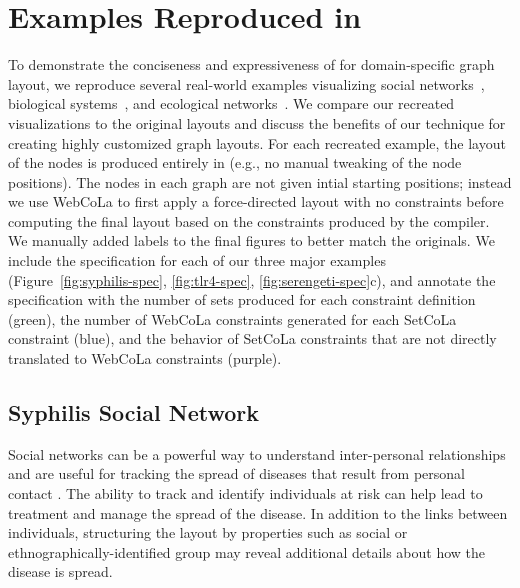 \section{Examples Reproduced in \projectname}

To demonstrate the conciseness and expressiveness of \projectname for domain-specific
graph layout, we reproduce several real-world examples visualizing social 
networks~\cite{rothenberg1998using}, biological systems~\cite{barsky2008cerebral}, 
and ecological networks~\cite{kruger2017,baskerville2011spatial}. 
We compare our recreated visualizations to the original layouts and 
discuss the benefits of our technique for creating highly customized graph layouts.
For each recreated example, the layout of the nodes is produced
entirely in \projectname (e.g., no manual tweaking of the node positions).
The nodes in each graph are not given intial starting positions; instead we 
use WebCoLa to first apply a force-directed layout with no constraints 
before computing the final layout based on the constraints produced by the \projectname compiler.
We manually added labels to the final figures to better match the originals.
We include the specification for each of our three major examples 
(Figure~\ref{fig:syphilis-spec}, \ref{fig:tlr4-spec}, \ref{fig:serengeti-spec}c),
and annotate the specification with the number of sets produced for each 
constraint definition (green), the number of WebCoLa constraints generated
for each SetCoLa constraint (blue), and the behavior of SetCoLa constraints
that are not directly translated to WebCoLa constraints (purple).

\vspace{-10px}
\subsection{Syphilis Social Network}
\label{sec:syphilis-example}
Social networks can be a powerful way to understand inter-personal
relationships and are useful for tracking the spread of diseases that
result from personal contact \cite{rothenberg1998using,fitzpatrick2001preventable,mcelroy2003network,fu2011hiv}.
The ability to track and identify individuals at risk can help
lead to treatment and manage the spread of the disease. In
addition to the links between individuals, structuring the layout by
properties such as social or ethnographically-identified group may reveal 
additional details about how the disease is spread.

